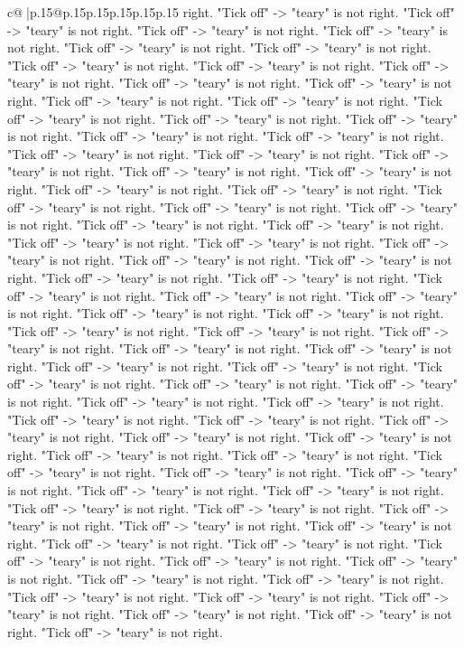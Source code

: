 \documentclass{article}
\begin{document}
{\begin{supertabular}{c@{$\;$}|p{.15\linewidth}@{}p{.15\linewidth}p{.15\linewidth}p{.15\linewidth}p{.15\linewidth}p{.15\linewidth}}
{{{right. "Tick off" {-}> "teary" is not right. "Tick off" {-}> "teary" is not right. "Tick off" {-}> "teary" is not right. "Tick off" {-}> "teary" is not right. "Tick off" {-}> "teary" is not right. "Tick off" {-}> "teary" is not right. "Tick off" {-}> "teary" is not right. "Tick off" {-}> "teary" is not right. "Tick off" {-}> "teary" is not right. "Tick off" {-}> "teary" is not right. "Tick off" {-}> "teary" is not right. "Tick off" {-}> "teary" is not right. "Tick off" {-}> "teary" is not right. "Tick off" {-}> "teary" is not right. "Tick off" {-}> "teary" is not right. "Tick off" {-}> "teary" is not right. "Tick off" {-}> "teary" is not right. "Tick off" {-}> "teary" is not right. "Tick off" {-}> "teary" is not right. "Tick off" {-}> "teary" is not right. "Tick off" {-}> "teary" is not right. "Tick off" {-}> "teary" is not right. "Tick off" {-}> "teary" is not right. "Tick off" {-}> "teary" is not right. "Tick off" {-}> "teary" is not right. "Tick off" {-}> "teary" is not right. "Tick off" {-}> "teary" is not right. "Tick off" {-}> "teary" is not right. "Tick off" {-}> "teary" is not right. "Tick off" {-}> "teary" is not right. "Tick off" {-}> "teary" is not right. "Tick off" {-}> "teary" is not right. "Tick off" {-}> "teary" is not right. "Tick off" {-}> "teary" is not right. "Tick off" {-}> "teary" is not right. "Tick off" {-}> "teary" is not right. "Tick off" {-}> "teary" is not right. "Tick off" {-}> "teary" is not right. "Tick off" {-}> "teary" is not right. "Tick off" {-}> "teary" is not right. "Tick off" {-}> "teary" is not right. "Tick off" {-}> "teary" is not right. "Tick off" {-}> "teary" is not right. "Tick off" {-}> "teary" is not right. "Tick off" {-}> "teary" is not right. "Tick off" {-}> "teary" is not right. "Tick off" {-}> "teary" is not right. "Tick off" {-}> "teary" is not right. "Tick off" {-}> "teary" is not right. "Tick off" {-}> "teary" is not right. "Tick off" {-}> "teary" is not right. "Tick off" {-}> "teary" is not right. "Tick off" {-}> "teary" is not right. "Tick off" {-}> "teary" is not right. "Tick off" {-}> "teary" is not right. "Tick off" {-}> "teary" is not right. "Tick off" {-}> "teary" is not right. "Tick off" {-}> "teary" is not right. "Tick off" {-}> "teary" is not right. "Tick off" {-}> "teary" is not right. "Tick off" {-}> "teary" is not right. "Tick off" {-}> "teary" is not right. "Tick off" {-}> "teary" is not right. "Tick off" {-}> "teary" is not right. "Tick off" {-}> "teary" is not right. "Tick off" {-}> "teary" is not right. "Tick off" {-}> "teary" is not right. "Tick off" {-}> "teary" is not right. "Tick off" {-}> "teary" is not right. "Tick off" {-}> "teary" is not right. "Tick off" {-}> "teary" is not right. "Tick off" {-}> "teary" is not right. "Tick off" {-}> "teary" is not right. "Tick off" {-}> "teary" is not right. "Tick off" {-}> "teary" is not right. "Tick off" {-}> "teary" is not right. "Tick off" {-}> "teary" is not right. "Tick off" {-}> "teary" is not right. "Tick off" {-}> "teary" is not right. "Tick off" {-}> "teary" is not right. "Tick off" {-}> "teary" is not right. "Tick off" {-}> "teary" is not right. "Tick off" {-}> "teary" is not right. "Tick off" {-}> "teary" is not right. }}}
\end{supertabular}}
\end{document}

